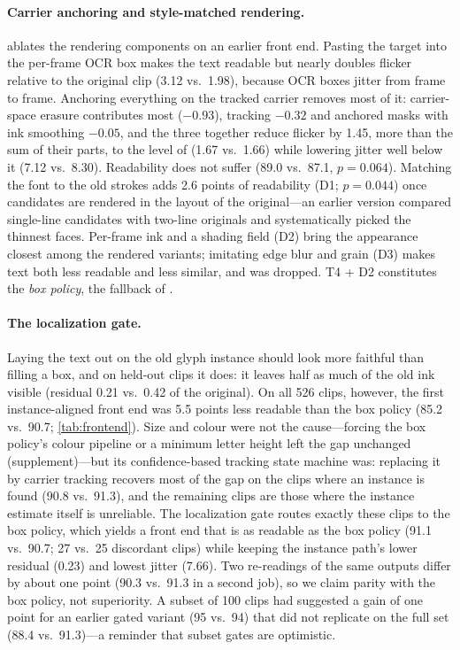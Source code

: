 

\paragraph{Carrier anchoring and style-matched rendering.}  ablates the rendering components on an earlier front end. Pasting the target into the per-frame OCR box makes the text readable but nearly doubles flicker relative to the original clip (3.12 vs.\ 1.98), because OCR boxes jitter from frame to frame. Anchoring everything on the tracked carrier removes most of it: carrier-space erasure contributes most ($-0.93$), tracking $-0.32$ and anchored masks with ink smoothing $-0.05$, and the three together reduce flicker by 1.45, more than the sum of their parts, to the level of \steer (1.67 vs.\ 1.66) while lowering jitter well below it (7.12 vs.\ 8.30). Readability does not suffer (89.0 vs.\ 87.1, $p=0.064$). Matching the font to the old strokes adds 2.6 points of readability (D1; $p=0.044$) once candidates are rendered in the layout of the original---an earlier version compared single-line candidates with two-line originals and systematically picked the thinnest faces. Per-frame ink and a shading field (D2) bring the appearance closest among the rendered variants; imitating edge blur and grain (D3) makes text both less readable and less similar, and was dropped. T4 + D2 constitutes the \emph{box policy}, the fallback of \method.

\paragraph{The localization gate.} Laying the text out on the old glyph instance should look more faithful than filling a box, and on held-out clips it does: it leaves half as much of the old ink visible (residual 0.21 vs.\ 0.42 of the original). On all 526 clips, however, the first instance-aligned front end was 5.5 points less readable than the box policy (85.2 vs.\ 90.7; \cref{tab:frontend}). Size and colour were not the cause---forcing the box policy's colour pipeline or a minimum letter height left the gap unchanged (supplement)---but its confidence-based tracking state machine was: replacing it by carrier tracking recovers most of the gap on the clips where an instance is found (90.8 vs.\ 91.3), and the remaining clips are those where the instance estimate itself is unreliable. The localization gate routes exactly these clips to the box policy, which yields a front end that is as readable as the box policy (91.1 vs.\ 90.7; 27 vs.\ 25 discordant clips) while keeping the instance path's lower residual (0.23) and lowest jitter (7.66). Two re-readings of the same outputs differ by about one point (90.3 vs.\ 91.3 in a second job), so we claim parity with the box policy, not superiority. A subset of 100 clips had suggested a gain of one point for an earlier gated variant (95 vs.\ 94) that did not replicate on the full set (88.4 vs.\ 91.3)---a reminder that subset gates are optimistic.
